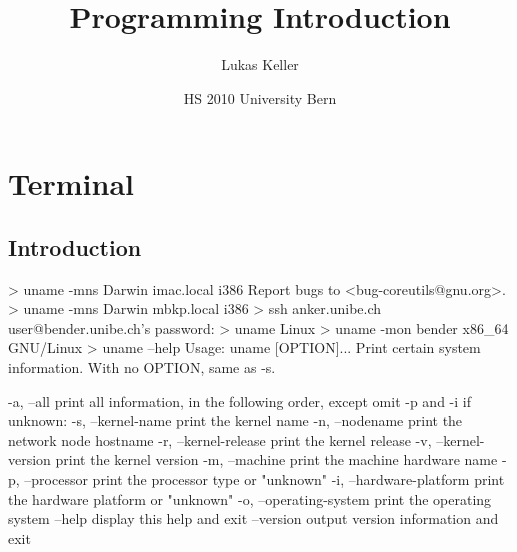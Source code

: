 \documentclass[10pt,a4paper]{scrartcl}
\date{HS 2010 University Bern}
\author{Lukas Keller}
\title{Programming Introduction}
\begin{document}
\maketitle

\tableofcontents

\newpage

\section{Terminal}
\subsection{Introduction}

\begin{terminalcode}
> uname -mns
  Darwin imac.local i386
  Report bugs to <bug-coreutils@gnu.org>.
> uname -mns
  Darwin mbkp.local i386
> ssh anker.unibe.ch
  user@bender.unibe.ch's password: 
> uname
  Linux
> uname -mon
  bender x86_64 GNU/Linux
> uname --help
  Usage: uname [OPTION]...
  Print certain system information.  With no OPTION, same as -s.
  
    -a, --all                print all information, in the following order,
                               except omit -p and -i if unknown:
    -s, --kernel-name        print the kernel name
    -n, --nodename           print the network node hostname
    -r, --kernel-release     print the kernel release
    -v, --kernel-version     print the kernel version
    -m, --machine            print the machine hardware name
    -p, --processor          print the processor type or "unknown"
    -i, --hardware-platform  print the hardware platform or "unknown"
    -o, --operating-system   print the operating system
        --help     display this help and exit
        --version  output version information and exit
\end{terminalcode}
\end{document}
